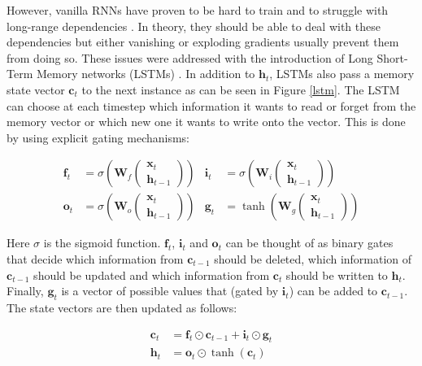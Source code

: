 However, vanilla RNNs have proven to be hard to train and to struggle with long-range dependencies \cite{hochreiter_rnn}. In theory, they should be able to deal with these dependencies but either vanishing or exploding gradients usually prevent them from doing so. These issues were addressed with the introduction of Long Short-Term Memory networks (LSTMs) \cite{lstm}. In addition to \(\mathbf{h}_t\), LSTMs also pass a memory state vector \(\mathbf{c}_t\) to the next instance as can be seen in Figure \ref{lstm}. The LSTM can choose at each timestep which information it wants to read or forget from the memory vector or which new one it wants to write onto the vector. This is done by using explicit gating mechanisms:

\begin{align*}
  \mathbf{f}_t &= \sigma \left(\mathbf{W}_f \begin{pmatrix} \mathbf{x}_t \\ \mathbf{h}_{t-1} \end{pmatrix} \right) &
  \mathbf{i}_t &= \sigma \left(\mathbf{W}_i \begin{pmatrix} \mathbf{x}_t \\ \mathbf{h}_{t-1} \end{pmatrix} \right) \\
  \mathbf{o}_t &= \sigma \left(\mathbf{W}_o \begin{pmatrix} \mathbf{x}_t \\ \mathbf{h}_{t-1} \end{pmatrix} \right) &
  \mathbf{g}_t &= \tanh \left(\mathbf{W}_g \begin{pmatrix} \mathbf{x}_t \\ \mathbf{h}_{t-1} \end{pmatrix} \right)
\end{align*}

Here \(\sigma\) is the sigmoid function. \(\mathbf{f}_t\), \(\mathbf{i}_t\) and \(\mathbf{o}_t\) can be thought of as binary gates that decide which information from \(\mathbf{c}_{t-1}\) should be deleted, which information of \(\mathbf{c}_{t-1}\) should be updated and which information from \(\mathbf{c}_t\) should be written to \(\mathbf{h}_t\). Finally, \(\mathbf{g}_t\) is a vector of possible values that (gated by \(\mathbf{i}_t\)) can be added to \(\mathbf{c}_{t-1}\). The state vectors are then updated as follows:

\begin{align*}
  \mathbf{c}_t &= \mathbf{f}_t \odot \mathbf{c}_{t-1} + \mathbf{i}_t \odot \mathbf{g}_t \\
  \mathbf{h}_t &= \mathbf{o}_t \odot \tanh(\mathbf{c}_t)
\end{align*}

